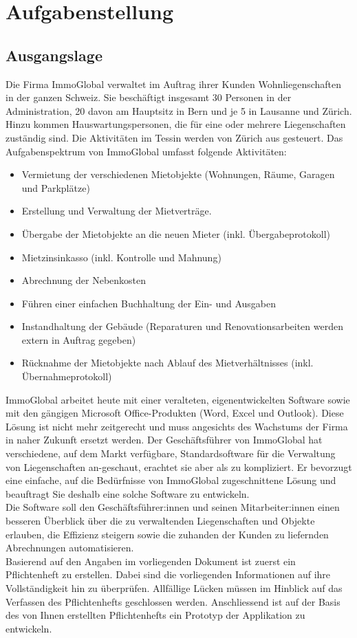 \section{Aufgabenstellung}
\subsection{Ausgangslage}

Die Firma ImmoGlobal verwaltet im Auftrag ihrer Kunden Wohnliegenschaften in der ganzen Schweiz. Sie beschäftigt insgesamt 30 Personen in der Administration, 20 davon am Hauptsitz in Bern und je 5 in Lausanne und Zürich. Hinzu kommen Hauswartungspersonen, die für eine oder mehrere Liegenschaften zuständig sind. Die Aktivitäten im Tessin werden von Zürich aus gesteuert.
Das Aufgabenspektrum von ImmoGlobal umfasst folgende Aktivitäten:
\begin{itemize}
    \item Vermietung der verschiedenen Mietobjekte (Wohnungen, Räume, Garagen und Parkplätze)
    \item Erstellung und Verwaltung der Mietverträge.
    \item Übergabe der Mietobjekte an die neuen Mieter (inkl. Übergabeprotokoll)
    \item Mietzinsinkasso (inkl. Kontrolle und Mahnung)
    \item Abrechnung der Nebenkosten
    \item Führen einer einfachen Buchhaltung der Ein- und Ausgaben
    \item Instandhaltung der Gebäude (Reparaturen und Renovationsarbeiten werden extern in Auftrag gegeben)
    \item Rücknahme der Mietobjekte nach Ablauf des Mietverhältnisses (inkl. Übernahmeprotokoll)
\end{itemize}

ImmoGlobal arbeitet heute mit einer veralteten, eigenentwickelten Software sowie mit den gängigen Microsoft Office-Produkten (Word, Excel und Outlook). Diese Lösung ist nicht mehr zeitgerecht und muss angesichts des Wachstums der Firma in naher Zukunft ersetzt werden. Der Geschäftsführer von ImmoGlobal hat verschiedene, auf dem Markt verfügbare, Standardsoftware für die Verwaltung von Liegenschaften an-geschaut, erachtet sie aber als zu kompliziert. Er bevorzugt eine einfache, auf die Bedürfnisse von ImmoGlobal zugeschnittene Lösung und beauftragt Sie deshalb eine solche Software zu entwickeln.\\
Die Software soll den Geschäftsführer:innen und seinen Mitarbeiter:innen einen besseren Überblick über die zu verwaltenden Liegenschaften und Objekte erlauben, die Effizienz steigern sowie die zuhanden der Kunden zu liefernden Abrechnungen automatisieren.\\
Basierend auf den Angaben im vorliegenden Dokument ist zuerst ein Pflichtenheft zu erstellen. Dabei sind die vorliegenden Informationen auf ihre Vollständigkeit hin zu überprüfen. Allfällige Lücken müssen im Hinblick auf das Verfassen des Pflichtenhefts geschlossen werden. Anschliessend ist auf der Basis des von Ihnen erstellten Pflichtenhefts ein Prototyp der Applikation zu entwickeln.

